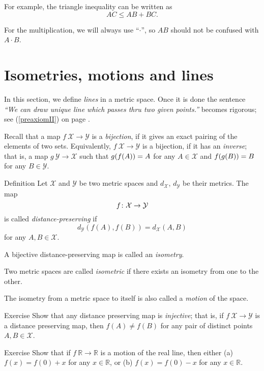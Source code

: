 For example, the triangle inequality can be written as 
$$AC\le AB+BC.$$

For the multiplication, we will always use ``$\cdot$'',
so $AB$ should not be confused with $A\cdot B$.

\section*{Isometries, motions and lines}

In this section, we define {}\emph{lines} in a metric space.
Once it is done the sentence  {}\emph{``We can draw unique line which passes thru two given points.''} becomes rigorous; see (\ref{preaxiomII}) on page \pageref{preaxiomII}. 

Recall that a map $f\:\mathcal{X}\to\mathcal{Y}$
is a \emph{bijection},
if it gives an exact pairing of the elements of two sets.
Equivalently, $f\:\mathcal{X}\to\mathcal{Y}$ is a bijection, if it has an \emph{inverse};
that is, a map $g\:\mathcal{Y}\to\mathcal{X}$
such that 
$g(f(A))\z=A$   for any $A\in\mathcal{X}$
and
$f(g(B))\z=B$ for any $B\in\mathcal{Y}$. 

\begin{thm}{Definition}\label{def:isom}
Let $\mathcal X$ and $\mathcal Y$ be two metric spaces and $d_{\mathcal X}$, $d_{\mathcal Y}$ be their metrics. 
The map 
$$f\:\mathcal X \z\to \mathcal Y$$ 
is
called \emph{distance-preserving} if 
$$d_{\mathcal Y}(f(A), f(B))
 = d_{\mathcal X}(A,B)$$
for any $A,B\in {\mathcal X}$.

A bijective distance-preserving map is called an \emph{isometry}. 

Two metric spaces are called
\emph{isometric} if there exists an isometry from one to the other.

The isometry from a metric space to itself 
is also called a \emph{motion} of the space.
\end{thm}

\begin{thm}{Exercise}\label{ex:dist-preserv=>injective}
Show that any distance preserving map  is \emph{injective};
that is, if $f\:\mathcal X\to\mathcal Y$ is a distance preserving map, 
then $f(A)\ne f(B)$ for any pair of distinct points $A,  B\in \mathcal X$.
\end{thm}

\begin{thm}{Exercise}\label{ex:motion-of-R}
Show that if $f\:\mathbb{R}\to\mathbb{R}$ is a motion of the real line,
then either (a)
$f(x)=f(0)+x$ for any $x\in \mathbb{R}$,  
or (b)
$f(x)=f(0)-x$ for any $x\in \mathbb{R}$. 

\end{thm}

